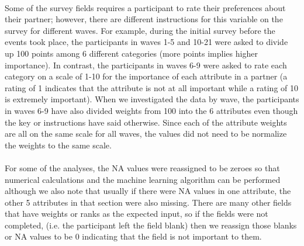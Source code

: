 \documentclass{article}
\begin{document}
\null\\
Some of the survey fields requires a participant to rate their preferences about their partner; however, there are different instructions for this variable on the survey for different waves.  For example, during the initial survey before the events took place, the participants in waves 1-5 and 10-21 were asked to divide up 100 points among 6 different categories (more points implies higher importance).  In contrast, the participants in waves 6-9 were asked to rate each category on a scale of 1-10 for the importance of each attribute in a partner (a rating of 1 indicates that the attribute is not at all important while a rating of 10 is extremely important).  When we investigated the data by wave, the participants in waves 6-9 have also divided weights from 100 into the 6 attributes even though the key or instructions have said otherwise. Since each of the attribute weights are all on the same scale for all waves, the values did not need to be normalize the weights to the same scale. \\
\null\\
For some of the analyses, the NA values were reassigned to be zeroes so that numerical calculations and the machine learning algorithm can be performed although we also note that usually if there were NA values in one attribute, the other 5 attributes in that section were also missing.  There are many other fields that have weights or ranks as the expected input, so if the fields were not completed, (i.e. the participant left the field blank) then we reassign those blanks or NA values to be 0 indicating that the field is not important to them.
%
\end{document}
